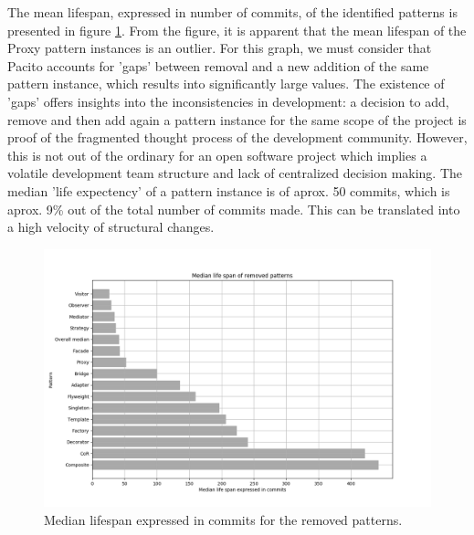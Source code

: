 The mean lifespan, expressed in number of commits, of the identified patterns is presented in figure \ref{fig:mean_life}. From the figure, it is apparent that the mean lifespan of the Proxy pattern instances is an outlier. For this graph, we must consider that Pacito  accounts for 'gaps' between removal and a new addition of the same pattern instance, which results into significantly large values. The existence of 'gaps' offers insights into the inconsistencies in development: a decision to add, remove and then add again a pattern instance for the same scope of the project is proof of the fragmented thought process of the development community. However, this is not out of the ordinary for an open software project which implies a volatile development team structure and lack of centralized decision making. The median 'life expectency' of a pattern instance is of aprox. 50 commits, which is aprox. 9\% out of the total number of commits made. This can be translated into a high velocity of structural changes.

\begin{figure}[H]
    \centering
    \includegraphics[width =  \textwidth]{images/graphs/mean_life.png}
    \caption{Median lifespan expressed in commits for the removed patterns.}
    \label{fig:mean_life}
\end{figure}


